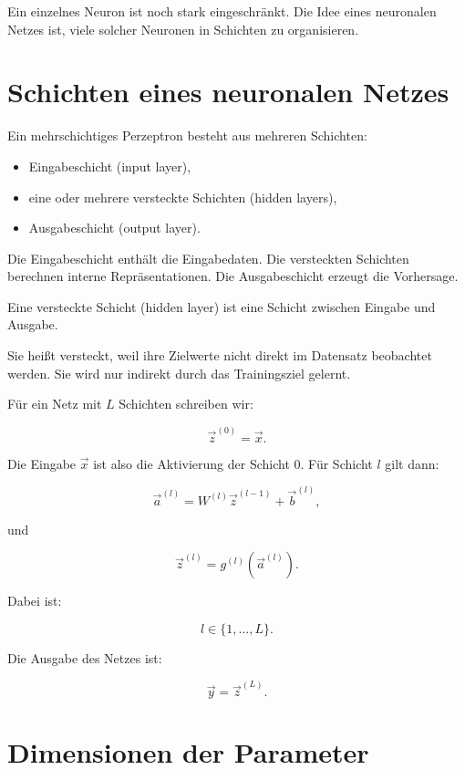 Ein einzelnes Neuron ist noch stark eingeschränkt.
Die Idee eines neuronalen Netzes ist, viele solcher Neuronen in Schichten zu organisieren.

\section{Schichten eines neuronalen Netzes}

Ein mehrschichtiges Perzeptron besteht aus mehreren Schichten:

\begin{itemize}
    \item Eingabeschicht (input layer),
    \item eine oder mehrere versteckte Schichten (hidden layers),
    \item Ausgabeschicht (output layer).
\end{itemize}

Die Eingabeschicht enthält die Eingabedaten.
Die versteckten Schichten berechnen interne Repräsentationen.
Die Ausgabeschicht erzeugt die Vorhersage.

\begin{definitionbox}
Eine versteckte Schicht (hidden layer) ist eine Schicht zwischen Eingabe und Ausgabe.

Sie heißt versteckt, weil ihre Zielwerte nicht direkt im Datensatz beobachtet werden.
Sie wird nur indirekt durch das Trainingsziel gelernt.
\end{definitionbox}

Für ein Netz mit \(L\) Schichten schreiben wir:

\[
    \vec{z}^{(0)}
    =
    \vec{x}.
\]

Die Eingabe \(\vec{x}\) ist also die Aktivierung der Schicht \(0\).
Für Schicht \(l\) gilt dann:

\[
    \vec{a}^{(l)}
    =
    W^{(l)}\vec{z}^{(l-1)}
    +
    \vec{b}^{(l)},
\]

und

\[
    \vec{z}^{(l)}
    =
    g^{(l)}(\vec{a}^{(l)}).
\]

Dabei ist:

\[
    l \in \{1,\dots,L\}.
\]

Die Ausgabe des Netzes ist:

\[
    \vec{y}
    =
    \vec{z}^{(L)}.
\]

\section{Dimensionen der Parameter}

